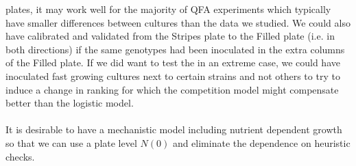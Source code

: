 plates, it may work well for the majority of QFA experiments which
typically have smaller differences between cultures than the data we
studied. We could also have calibrated and validated from the Stripes
plate to the Filled plate (i.e. in both directions) if the same
genotypes had been inoculated in the extra columns of the Filled
plate. If we did want to test the in an extreme case, we could have
inoculated fast growing cultures next to certain strains and not
others to try to induce a change in ranking for which the competition
model might compensate better than the logistic model.
\\\\
It is desirable to have a mechanistic model including nutrient
dependent growth so that we can use a plate level \(N(0)\) and
eliminate the dependence on heuristic checks.






